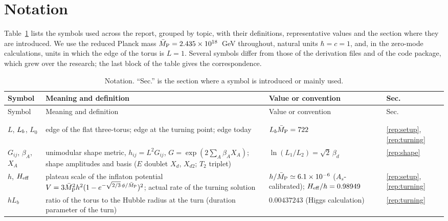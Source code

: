
\section{Notation}\label{rep:app-notation}

Table~\ref{tab:a-notation} lists the symbols used across the report, grouped by topic, with their definitions, representative values and the section where they are introduced.
We use the reduced Planck mass $\bar M_{\mathrm{P}}=2.435\times10^{18}$~GeV throughout, natural units $\hbar=c=1$, and, in the zero-mode calculations, units in which the edge of the torus is $L=1$.
Several symbols differ from those of the derivation files and of the code package, which grew over the research; the last block of the table gives the correspondence.

{\small
\begin{longtable}{@{}>{\raggedright\arraybackslash}p{}>{\raggedright\arraybackslash}p{}>{\raggedright\arraybackslash}p{}>{\raggedright\arraybackslash}p{}@{}}
\caption{Notation. ``Sec.'' is the section where a symbol is introduced or mainly used.}\label{tab:a-notation}\\
\toprule Symbol & Meaning and definition & Value or convention & Sec. \\ \midrule\endfirsthead
\toprule Symbol & Meaning and definition & Value or convention & Sec. \\ \midrule\endhead
\midrule\multicolumn{4}{r}{\emph{continued}}\\\endfoot\bottomrule\endlastfoot
\multicolumn{4}{@{}l}{\emph{Geometry and background}}\\*
$L$, $L_b$, $L_0$ & edge of the flat three-torus; edge at the turning point; edge today & $L_b\bar M_{\mathrm{P}}=722$ & \ref{rep:setup}, \ref{rep:turning} \\ %
$G_{ij}$, $\beta_A$, $X_A$ & unimodular shape metric, $h_{ij}=L^2G_{ij}$, $G=\exp(2\sum_A\beta_AX_A)$; shape amplitudes and basis ($E$ doublet $X_d$, $X_{d2}$; $T_2$ triplet) & $\ln(L_1/L_2)=\sqrt2\,\beta_d$ & \ref{rep:shape} \\
$h$, $H_{\rm eff}$ & plateau scale of the inflaton potential $V=3\bar M_{\mathrm{P}}^2h^2(1-e^{-\sqrt{2/3}\,\phi/\bar M_{\mathrm{P}}})^2$; actual rate of the turning solution & $h/\bar M_{\mathrm{P}}\simeq6.1\times10^{-6}$ ($A_s$-calibrated); $H_{\rm eff}/h=0.98949$ & \ref{rep:setup}, \ref{rep:turning} \\
$hL_b$ & ratio of the torus to the Hubble radius at the turn (duration parameter of the turn) & $0.00437243$ (Higgs calculation) & \ref{rep:turning} \\

\end{longtable}}
